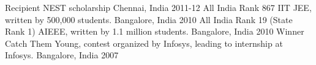 \begin{cvhonors}
	\cvhonor
	{Recipient}
	{NEST scholarship}
	{Chennai, India}
	{2011-12}
	\cvhonor
	{All India Rank 867}
	{IIT JEE, written by 500,000 students.}
	{Bangalore, India}
	{2010}
	\cvhonor
	{All India Rank 19 (State Rank 1)}
	{AIEEE, written by 1.1 million students.}
	{Bangalore, India}
	{2010}
	\cvhonor
	{Winner}
	{Catch Them Young, contest organized by Infosys, leading to internship at Infosys.}
	{Bangalore, India}
	{2007}
\end{cvhonors}
